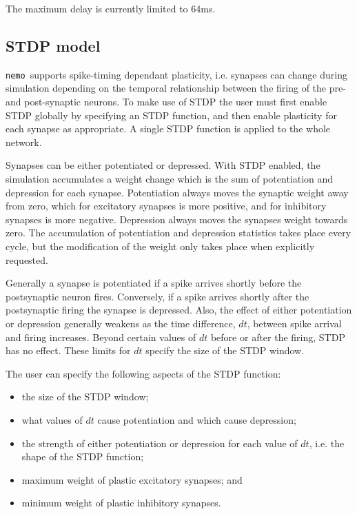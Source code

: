 \documentclass[a4paper]{article}
\newcommand{\nemo}{\texttt{nemo}}
\begin{document}
The maximum delay is currently limited to 64ms.

\subsection{STDP model}
\label{stdp}

\nemo\ supports spike-timing dependant plasticity,
	i.e. synapses can change during simulation depending on the temporal relationship 
between the firing of the pre- and post-synaptic neurons. 
To make use of STDP the user must first enable STDP globally by specifying an STDP function,
and then enable plasticity for each synapse as appropriate.
A single STDP function is applied to the whole network.

Synapses can be either potentiated or depressed.
With STDP enabled,
	the simulation accumulates a weight change
	which is the sum of potentiation and depression for each synapse. 
Potentiation always moves the synaptic weight away from zero,
	which for excitatory synapses is more positive,
	and for inhibitory synapses is more negative.
Depression always moves the synapses weight towards zero.
The accumulation of potentiation and depression statistics takes place every cycle,
	but the modification of the weight only takes place when explicitly requested.

Generally a synapse is potentiated if a spike arrives shortly before the postsynaptic neuron fires. 
Conversely, if a spike arrives shortly after the postsynaptic firing the synapse is depressed. 
Also, the effect of either potentiation or depression generally weakens as the time difference, $dt$, 
	between spike arrival and firing increases. 
Beyond certain values of $dt$ before or after the firing, STDP has no effect. 
These limits for $dt$ specify the size of the STDP window.

The user can specify the following aspects of the STDP function:

\begin{itemize}
	\item the size of the STDP window;
	\item what values of $dt$ cause potentiation and which cause depression;
	\item the strength of either potentiation or depression for each value of $dt$, 
		i.e. the shape of the STDP function;
	\item maximum weight of plastic excitatory synapses; and
	\item minimum weight of plastic inhibitory synapses.
\end{itemize}
\end{document}
